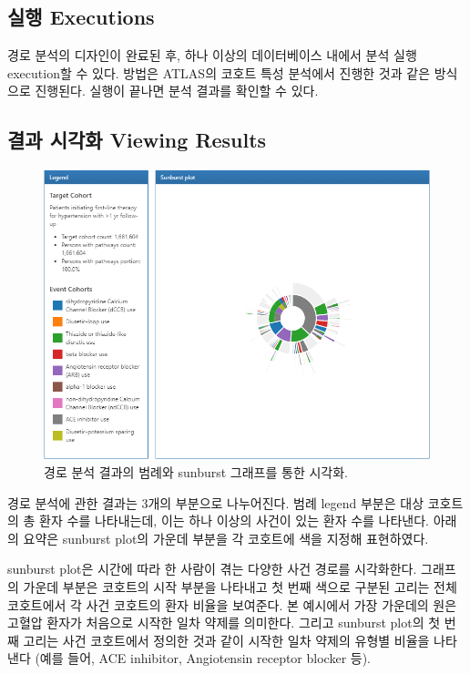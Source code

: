 \documentclass[10.5pt]{book}
\theoremstyle{definition}
\theoremstyle{definition}
\theoremstyle{definition}
\theoremstyle{remark}
\begin{document}
\subsection{실행 Executions}\label{-executions}

경로 분석의 디자인이 완료된 후, 하나 이상의 데이터베이스 내에서 분석
실행 execution할 수 있다. 방법은 ATLAS의 코호트 특성 분석에서 진행한
것과 같은 방식으로 진행된다. 실행이 끝나면 분석 결과를 확인할 수 있다.

\subsection{결과 시각화 Viewing Results}\label{--viewing-results}

\begin{figure}

{\centering \includegraphics[width=1\linewidth]{images/Characterization/atlasPathwaysResults} 

}

\caption{경로 분석 결과의 범례와 sunburst 그래프를 통한 시각화.}\label{fig:atlasPathwaysResults}
\end{figure}

경로 분석에 관한 결과는 3개의 부분으로 나누어진다. 범례 legend 부분은
대상 코호트의 총 환자 수를 나타내는데, 이는 하나 이상의 사건이 있는 환자
수를 나타낸다. 아래의 요약은 sunburst plot의 가운데 부분을 각 코호트에
색을 지정해 표현하였다.

sunburst plot은 시간에 따라 한 사람이 겪는 다양한 사건 경로를
시각화한다. 그래프의 가운데 부분은 코호트의 시작 부분을 나타내고 첫 번째
색으로 구분된 고리는 전체 코호트에서 각 사건 코호트의 환자 비율을
보여준다. 본 예시에서 가장 가운데의 원은 고혈압 환자가 처음으로 시작한
일차 약제를 의미한다. 그리고 sunburst plot의 첫 번째 고리는 사건
코호트에서 정의한 것과 같이 시작한 일차 약제의 유형별 비율을 나타낸다
(예를 들어, ACE inhibitor, Angiotensin receptor blocker 등).
\end{document}
